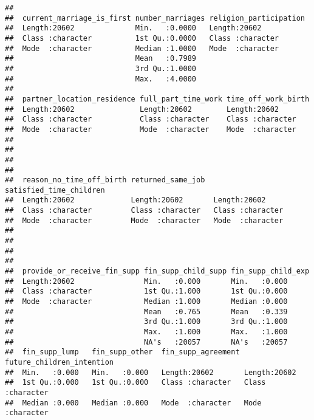 \documentclass[
]{article}
\begin{document}
\begin{verbatim}
##                                                                 
##  current_marriage_is_first number_marriages religion_participation
##  Length:20602              Min.   :0.0000   Length:20602          
##  Class :character          1st Qu.:0.0000   Class :character      
##  Mode  :character          Median :1.0000   Mode  :character      
##                            Mean   :0.7989                         
##                            3rd Qu.:1.0000                         
##                            Max.   :4.0000                         
##                                                                   
##  partner_location_residence full_part_time_work time_off_work_birth
##  Length:20602               Length:20602        Length:20602       
##  Class :character           Class :character    Class :character   
##  Mode  :character           Mode  :character    Mode  :character   
##                                                                    
##                                                                    
##                                                                    
##                                                                    
##  reason_no_time_off_birth returned_same_job  satisfied_time_children
##  Length:20602             Length:20602       Length:20602           
##  Class :character         Class :character   Class :character       
##  Mode  :character         Mode  :character   Mode  :character       
##                                                                     
##                                                                     
##                                                                     
##                                                                     
##  provide_or_receive_fin_supp fin_supp_child_supp fin_supp_child_exp
##  Length:20602                Min.   :0.000       Min.   :0.000     
##  Class :character            1st Qu.:1.000       1st Qu.:0.000     
##  Mode  :character            Median :1.000       Median :0.000     
##                              Mean   :0.765       Mean   :0.339     
##                              3rd Qu.:1.000       3rd Qu.:1.000     
##                              Max.   :1.000       Max.   :1.000     
##                              NA's   :20057       NA's   :20057     
##  fin_supp_lump   fin_supp_other  fin_supp_agreement future_children_intention
##  Min.   :0.000   Min.   :0.000   Length:20602       Length:20602             
##  1st Qu.:0.000   1st Qu.:0.000   Class :character   Class :character         
##  Median :0.000   Median :0.000   Mode  :character   Mode  :character         

\end{verbatim}
\end{document}
